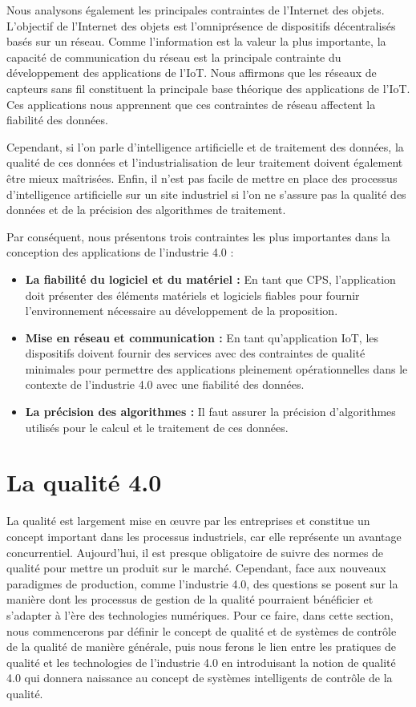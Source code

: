 Nous analysons également les principales contraintes de l'Internet des objets. L'objectif de l'Internet des objets est l'omniprésence de dispositifs décentralisés basés sur un réseau. Comme l'information est la valeur la plus importante, la capacité de communication du réseau est la principale contrainte du développement des applications de l'IoT. Nous affirmons que les réseaux de capteurs sans fil constituent la principale base théorique des applications de l'IoT. Ces applications nous apprennent que ces contraintes de réseau affectent la fiabilité des données.

Cependant, si l'on parle d'intelligence artificielle et de traitement des données, la qualité de ces données et l'industrialisation de leur traitement doivent également être mieux maîtrisées. Enfin, il n'est pas facile de mettre en place des processus d'intelligence artificielle sur un site industriel si l'on ne s'assure pas la qualité des données et de la précision des algorithmes de traitement.

Par conséquent, nous présentons trois contraintes les plus importantes dans la conception des applications de l'industrie 4.0 :

\begin{itemize}
    \item \textbf{La fiabilité du logiciel et du matériel :} En tant que CPS, l'application doit présenter des éléments matériels et logiciels fiables pour fournir l'environnement nécessaire au développement de la proposition.
    \item \textbf{Mise en réseau et communication :} En tant qu'application IoT, les dispositifs doivent fournir des services avec des contraintes de qualité minimales pour permettre des applications pleinement opérationnelles dans le contexte de l'industrie 4.0 avec une fiabilité des données.
    \item \textbf{La précision des algorithmes :} Il faut assurer la précision d’algorithmes utilisés pour le calcul et le traitement de ces données.

 
\end{itemize}

\section{La qualité 4.0}
La qualité est largement mise en œuvre par les entreprises et constitue un concept important dans les processus industriels, car elle représente un avantage concurrentiel. Aujourd'hui, il est presque obligatoire de suivre des normes de qualité pour mettre un produit sur le marché. Cependant, face aux nouveaux paradigmes de production, comme l'industrie 4.0, des questions se posent sur la manière dont les processus de gestion de la qualité pourraient bénéficier et s'adapter à l'ère des technologies numériques. Pour ce faire, dans cette section, nous commencerons par définir le concept de qualité et de systèmes de contrôle de la qualité de manière générale, puis nous ferons le lien entre les pratiques de qualité et les technologies de l'industrie 4.0 en introduisant la notion de qualité 4.0 qui donnera naissance au concept de systèmes intelligents de contrôle de la qualité.

